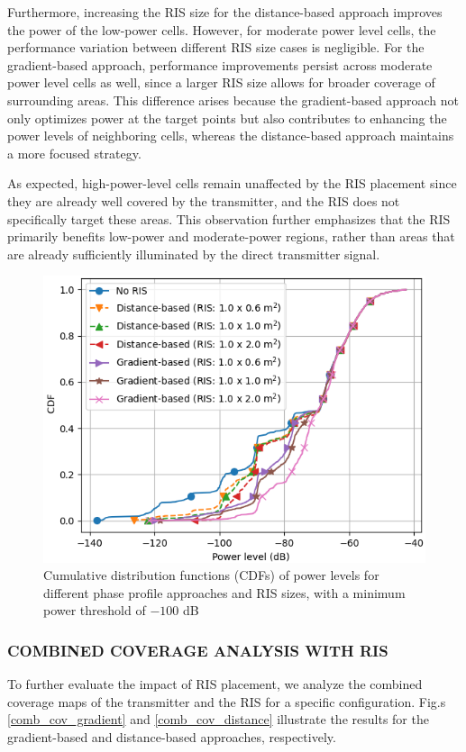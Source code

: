 \documentclass{IEEEoj}
\begin{document}
Furthermore, increasing the RIS size for the distance-based approach improves the power of the low-power cells. However, for moderate power level cells, the performance variation between different RIS size cases is negligible. For the gradient-based approach, performance improvements persist across moderate power level cells as well, since a larger RIS size allows for broader coverage of surrounding areas. This difference arises because the gradient-based approach not only optimizes power at the target points but also contributes to enhancing the power levels of neighboring cells, whereas the distance-based approach maintains a more focused strategy.

As expected, high-power-level cells remain unaffected by the RIS placement since they are already well covered by the transmitter, and the RIS does not specifically target these areas. This observation further emphasizes that the RIS primarily benefits low-power and moderate-power regions, rather than areas that are already sufficiently illuminated by the direct transmitter signal.

\begin{figure}
	\centering \includegraphics[width=.9\linewidth]{Sim_Results/CDF_-100dB.png}
	\caption{Cumulative distribution functions (CDFs) of power levels for different phase profile approaches and RIS sizes, with a minimum power threshold of $-100$ dB}
	\label{CDF_-100dB}
\end{figure}

\subsubsection{COMBINED COVERAGE ANALYSIS WITH RIS}
To further evaluate the impact of RIS placement, we analyze the combined coverage maps of the transmitter and the RIS for a specific configuration. Fig.s \ref{comb_cov_gradient} and \ref{comb_cov_distance} illustrate the results for the gradient-based and distance-based approaches, respectively.
\end{document}
